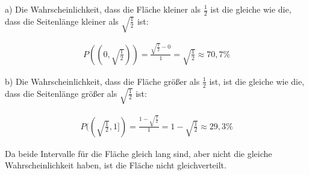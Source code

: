 \documentclass[11pt,a4paper]{article}
\begin{document}
  a) Die Wahrscheinlichkeit, dass die Fläche kleiner als $\frac{1}{2}$ ist die gleiche wie die, dass die Seitenlänge kleiner als $\sqrt{\frac{1}{2}}$ ist:

  \begin{align*}
    P((0,\sqrt{\frac{1}{2}})) = \frac{\sqrt{\frac{1}{2}} - 0}{1} = \sqrt{\frac{1}{2}} \approx 70,7 \%
  \end{align*}

  b) Die Wahrscheinlichkeit, dass die Fläche größer als $\frac{1}{2}$ ist, ist die gleiche wie die, dass die Seitenlänge größer als $\sqrt{\frac{1}{2}}$ ist:

  \begin{align*}
    P((\sqrt{\frac{1}{2}},1]) = \frac{1 - \sqrt{\frac{1}{2}}}{1} = 1 - \sqrt{\frac{1}{2}} \approx 29,3 \%
  \end{align*}

  Da beide Intervalle für die Fläche gleich lang sind, aber nicht die gleiche Wahrscheinlichkeit haben, ist die Fläche nicht gleichverteilt.
\end{document}
